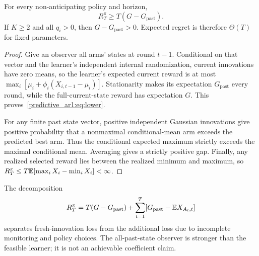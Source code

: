 \begin{proposition}
For every non-anticipating policy and horizon,
\begin{equation}
R_T^\pi\geq T(G-G_{\mathrm{past}}).
\label{predictive_ar1:eq:lower}
\end{equation}
If $K\geq2$ and all $q_i>0$, then $G-G_{\mathrm{past}}>0$. Expected regret is therefore $\Theta(T)$ for fixed parameters.
\end{proposition}
\begin{proof}
Give an observer all arms' states at round $t-1$. Conditional on that vector and the learner's independent internal randomization, current innovations have zero means, so the learner's expected current reward is at most $\max_i[\mu_i+\phi_i(X_{i,t-1}-\mu_i)]$. Stationarity makes its expectation $G_{\mathrm{past}}$ every round, while the full-current-state reward has expectation $G$. This proves~\eqref{predictive_ar1:eq:lower}.

For any finite past state vector, positive independent Gaussian innovations give positive probability that a nonmaximal conditional-mean arm exceeds the predicted best arm. Thus the conditional expected maximum strictly exceeds the maximal conditional mean. Averaging gives a strictly positive gap. Finally, any realized selected reward lies between the realized minimum and maximum, so
$R_T^\pi\leq T\mathbb E[\max_iX_i-\min_iX_i]<\infty$.
\end{proof}
The decomposition
\begin{equation}
R_T^\pi=T(G-G_{\mathrm{past}})+
\sum_{t=1}^T[G_{\mathrm{past}}-\mathbb E X_{A_t,t}]
\end{equation}
separates fresh-innovation loss from the additional loss due to incomplete monitoring and policy choices. The all-past-state observer is stronger than the feasible learner; it is not an achievable coefficient claim.

